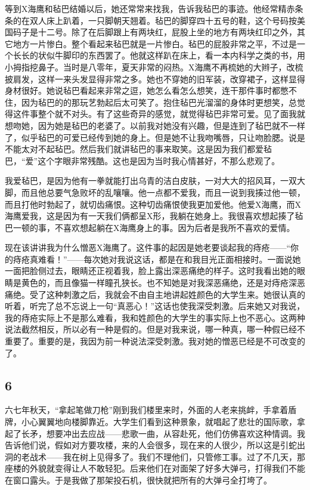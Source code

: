 等到X海鹰和毡巴结婚以后，她还常常来找我，告诉我毡巴的事迹。他经常精赤条条的在双人床上趴着，一只脚朝天翘着。毡巴的脚穿四十五号的鞋，这个号码按美国码子是十二号。除了在后脚跟上有两块红，屁股上坐的地方有两块红印之外，其它地方一片惨白。整个看起来毡巴就是一片惨白。毡巴的屁股非常之平，不过是一个长长的状似牛脚印的东西罢了。他就这样趴在床上，看一本内科学之类的书，用小拇指挖鼻子。当时是八零年，夏天非常的闷热。X海鹰不再梳她的大辫子，改梳披肩发，这样一来头发显得非常之多。她也不穿她的旧军装，改穿裙子，这样显得身材很好。她说毡巴看起来非常之逗，她怎么看怎么想笑，连干那件事时都憋不住，因为毡巴的的那玩艺勃起后太可笑了。抱住毡巴光溜溜的身体时更想笑，总觉得这件事整个就不对头。有了这些奇异的感觉，就觉得毡巴非常可爱。见了面我就想吻她，因为她是毡巴的老婆了。以前我对她没有兴趣，但是连到了毡巴就不一样了，似乎毡巴的可爱已经传到她的身上。但是她不让我吻嘴唇，只让吻脸腮。说是不能太对不起毡巴。然后我们就讲毡巴的事来取笑。这是因为我们都爱毡巴，“爱”这个字眼非常残酷。这也是因为当时我心情甚好，不那么悲观了。 

我爱毡巴，是因为他有一拳就能打出乌青的洁白皮肤，一对大大的招风耳，一双大脚，而且他总要气急败坏的乱嚷嚷。他一点都不爱我，而且一说到我揍过他一顿，而且打他时勃起了，就切齿痛恨。这种切齿痛恨使我更加爱他。他爱X海鹰，而X海鹰爱我，这是因为有一天我们俩都呈X形，我躺在她身上。我很喜欢想起揍了毡巴一顿的事，不喜欢想起躺在X海鹰身上的事。因为后者是我所不喜欢的爱情。 

现在该讲讲我为什么憎恶X海鹰了。这件事的起因是她老要谈起我的痔疮——“你的痔疮真难看！”——每次她对我说这话，都是在和我目光正面相接时。一面说她一面把脸侧过去，眼睛还正视着我，脸上露出深恶痛绝的样子。这时我看出她的眼睛是黄色的，而且像猫一样瞳孔狭长。也不知她是对我深恶痛绝，还是对痔疮深恶痛绝。受了这种刺激之后，我就会不由自主地讲起姓颜色的大学生来。她很认真的听着，听完了总不忘说上一句“真恶心！”这话也使我深受刺激。后来她又对我说，我的痔疮实际上不是那么难看，我和姓颜色的大学生的事实际上也不恶心。这两种说法截然相反，所以必有一种是假的。但是对我来说，哪一种真，哪一种假已经不重要了。重要的是，我因为前一种说法深受刺激。我对她的憎恶已经是不可改变的了。

\subsection{6} 

六七年秋天，“拿起笔做刀枪”刚到我们楼里来时，外面的人老来挑衅，手拿着盾牌，小心翼翼地向楼脚靠近。大学生们看到这种景象，就唱起了悲壮的国际歌，拿起了长矛，想要冲出去应战——悲歌一曲，从容赴死，他们仿佛喜欢这种情调。我告诉他们说，假如对方要攻楼，来的人会很多，现在来的人很少，所以这是引蛇出洞的老战术——我在树上见得多了。我们不理他们，只管修工事。过了不几天，那座楼的外貌就变得让人不敢轻犯。后来他们在对面架了好多大弹弓，打得我们不能在窗口露头。于是我做了那架投石机，很快就把所有的大弹弓全打垮了。 

